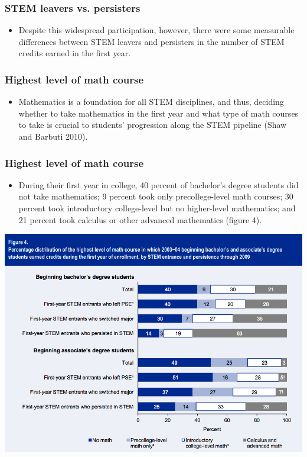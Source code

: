 \documentclass{beamer}
\begin{document}
\begin{frame}
  \frametitle{STEM leavers vs. persisters}
  \begin{itemize}
  \item Despite this widespread participation, however, there were some measurable
differences between STEM leavers and persisters in the number of STEM credits
earned in the first year. 
  \end{itemize}
\end{frame}

\begin{frame}
  \frametitle{Highest level of math course}
  \begin{itemize}
  \item Mathematics is a foundation for all STEM disciplines, and thus, deciding whether to
take mathematics in the first year and what type of math courses to take is crucial to
students’ progression along the STEM pipeline (Shaw and Barbuti 2010).
\end{itemize}
\end{frame}

\begin{frame}
  \frametitle{Highest level of math course}
  \begin{itemize}
\item During their first year in college, 40 percent of bachelor’s degree students did not take
mathematics; 9 percent took only precollege-level math courses; 30 percent took
introductory college-level but no higher-level mathematics; and 21 percent took
calculus or other advanced mathematics (figure 4).
\end{itemize}
\end{frame}

\begin{frame}
  \includegraphics[scale = 0.33]{fig4.png}
\end{frame}
\end{document}
